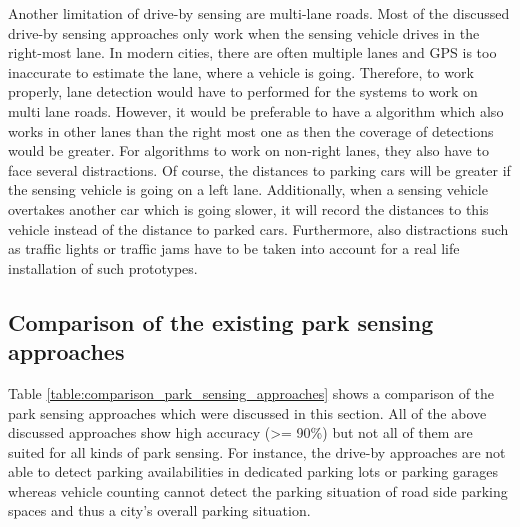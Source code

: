 Another limitation of drive-by sensing are multi-lane roads. Most of the discussed drive-by sensing approaches only work when the sensing vehicle drives in the right-most lane. In modern cities, there are often multiple lanes and GPS is too inaccurate to estimate the lane, where a vehicle is going. Therefore, to work properly, lane detection would have to performed for the systems to work on multi lane roads. However, it would be preferable to have a algorithm which also works in other lanes than the right most one as then the coverage of detections would be greater. For algorithms to work on non-right lanes, they also have to face several distractions. Of course, the distances to parking cars will be greater if the sensing vehicle is going on a left lane. Additionally, when a sensing vehicle overtakes another car which is going slower, it will record the distances to this vehicle instead of the distance to parked cars. Furthermore, also distractions such as traffic lights or traffic jams have to be taken into account for a real life installation of such prototypes.




\subsection{Comparison of the existing park sensing approaches}
\label{sec:comparison_park_sensing_approaches}

Table \ref{table:comparison_park_sensing_approaches} shows a comparison of the park sensing approaches which were discussed in this section. All of the above discussed approaches show high accuracy (>= 90\%) but not all of them are suited for all kinds of park sensing. For instance, the drive-by approaches are not able to detect parking availabilities in dedicated parking lots or parking garages whereas vehicle counting cannot detect the parking situation of road side parking spaces and thus a city's overall parking situation.

